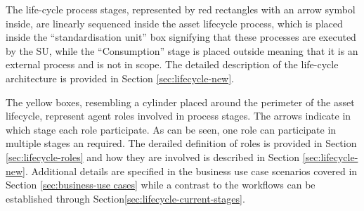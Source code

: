 	The life-cycle process stages, represented by red rectangles with an arrow symbol inside, are linearly sequenced inside the asset lifecycle process, which is placed inside the ``standardisation unit'' box signifying that these processes are executed by the SU, while the ``Consumption'' stage is placed outside meaning that it is an external process and is not in scope. The detailed description of the life-cycle architecture is provided in Section \ref{sec:lifecycle-new}.
	
	The yellow boxes, resembling a cylinder placed around the perimeter of the asset lifecycle, represent agent roles involved in process stages. The arrows indicate in which stage each role participate. As can be seen, one role can participate in multiple stages an required. The derailed definition of roles is provided in Section \ref{sec:lifecycle-roles} and how they are involved is described in Section \ref{sec:lifecycle-new}. Additional details are specified in the business use case scenarios covered in Section \ref{sec:business-use cases} while a contrast to the workflows can be established through Section\ref{sec:lifecycle-current-stages}.